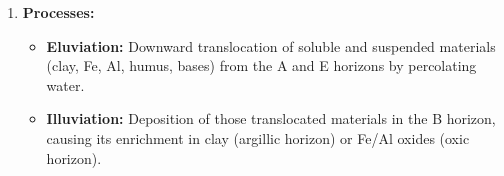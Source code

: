 \documentclass[11pt]{article}
\begin{document}
\begin{corrige}
\begin{enumerate}
\begin{itemize}
\item \textbf{B:} Red-brown to yellow-brown, accumulation of clay, Fe/Al oxides and organic matter (illuviation), blocky/prismatic structure, higher bulk density, lower porosity than A.
\item \textbf{C:} Partially weathered parent material, rock structure still visible (e.g., saprolite), little biological activity, mineral composition reflects parent rock.
\item \textbf{R:} Consolidated unweathered bedrock, no soil structure, no biological activity.
\end{itemize}
\item \textbf{Processes:}
\begin{itemize}
\item \textbf{Eluviation:} Downward translocation of soluble and suspended materials (clay, Fe, Al, humus, bases) from the A and E horizons by percolating water.
\item \textbf{Illuviation:} Deposition of those translocated materials in the B horizon, causing its enrichment in clay (argillic horizon) or Fe/Al oxides (oxic horizon).
\end{itemize}
\end{enumerate}
\end{corrige}
\end{document}
